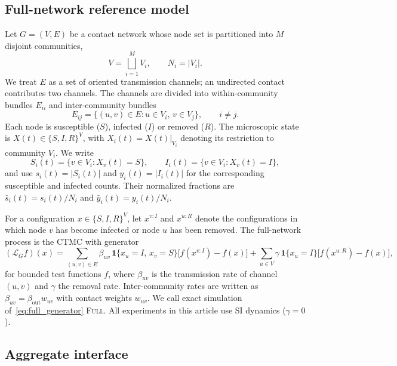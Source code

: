 \documentclass[a4paper,fleqn]{cas-sc}
\newcommand{\ibar}{\bar{y}}
\newcommand{\sbar}{\bar{s}}
\newcommand{\Full}{\textup{\textsc{Full}}}
\newcommand{\ind}{\mathbf{1}}
\begin{document}
\subsection{Full-network reference model}
\label{sec:reference}

Let $G=(V,E)$ be a contact network whose node set is partitioned into $M$ disjoint communities,
\begin{equation}
\label{eq:partition}
V=\bigsqcup_{i=1}^{M}V_i,
\qquad
N_i=|V_i|.
\end{equation}
We treat $E$ as a set of oriented transmission channels; an undirected contact contributes two channels. The channels are divided into within-community bundles $E_{ii}$ and inter-community bundles
\[
E_{ij}=\{(u,v)\in E:u\in V_i,\,v\in V_j\},
\qquad i\neq j.
\]
Each node is susceptible ($S$), infected ($I$) or removed ($R$). The microscopic state is $X(t)\in\{S,I,R\}^{V}$, with $X_i(t)=X(t)|_{V_i}$ denoting its restriction to community $V_i$. We write
\[
S_i(t)=\{v\in V_i:X_v(t)=S\},
\qquad
I_i(t)=\{v\in V_i:X_v(t)=I\},
\]
and use $s_i(t)=|S_i(t)|$ and $y_i(t)=|I_i(t)|$ for the corresponding susceptible and infected counts. Their normalized fractions are $\sbar_i(t)=s_i(t)/N_i$ and $\ibar_i(t)=y_i(t)/N_i$.

For a configuration $x\in\{S,I,R\}^V$, let $x^{v:I}$ and $x^{u:R}$ denote the configurations in which node $v$ has become infected or node $u$ has been removed. The full-network process is the CTMC with generator
\begin{equation}
\label{eq:full_generator}
(\mathcal{L}_G f)(x)=\sum_{(u,v)\in E}\beta_{uv}\,\ind\{x_u=I,\,x_v=S\}\bigl[f(x^{v:I})-f(x)\bigr]
+\sum_{u\in V}\gamma\,\ind\{x_u=I\}\bigl[f(x^{u:R})-f(x)\bigr],
\end{equation}
for bounded test functions $f$, where $\beta_{uv}$ is the transmission rate of channel $(u,v)$ and $\gamma$ the removal rate. Inter-community rates are written as $\beta_{uv}=\beta_{\mathrm{out}}w_{uv}$ with contact weights $w_{uv}$. We call exact simulation of~\eqref{eq:full_generator} \Full{}. All experiments in this article use SI dynamics ($\gamma=0$).

\subsection{Aggregate interface}
\label{sec:interface}
\end{document}
